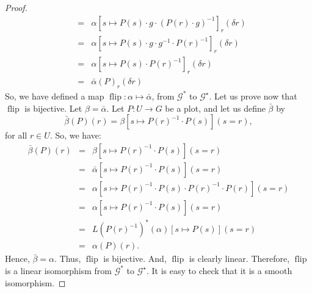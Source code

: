 \documentclass[10pt,reqno,twoside]{amsart}
\newcommand{\cG}{\mathcal{G}}
\DeclareMathOperator{\flip}{flip}
\renewcommand{\L}{L}
\theoremstyle{plain}
\theoremstyle{definition}
\begin{document}
\begin{proof}
\begin{eqnarray*}
      & = & \alpha\left[s \mapsto P (s) \cdot g \cdot (P (r) \cdot g)^{-1}\right]_r(\delta r) \\
      & = & \alpha\left[s \mapsto P (s) \cdot g \cdot g^{-1} \cdot P (r)^{-1}\right]_r(\delta r) \\
      & = & \alpha\left[s \mapsto P (s) \cdot P (r)^{-1}\right]_r(\delta r) \\
      & = & \bar{\alpha}(P)_r(\delta r)
    \end{eqnarray*}
    So,
    we have defined a map $\flip : \alpha \mapsto \bar \alpha$,
    from $\cG^*$ to $\cG^\star$.
    Let us prove now that $\flip$ is bijective.
    Let $\beta = \bar \alpha$.
    Let $P : U \to G$ be a plot,
    and let us define $\bar \beta$ by
    $$\bar \beta(P)(r) = \beta [s \mapsto P (r)^{-1} \cdot P (s)](s=r),
      $$
    for all $r \in U$.
    So,
    we have:
    \begin{eqnarray*}
      \bar\beta(P)(r)
      & = & \beta \left[s \mapsto P (r)^{-1} \cdot P (s)\right](s=r) \\
      & = & \bar \alpha \left[s \mapsto P (r)^{-1} \cdot P (s)\right](s=r) \\
      & = & \alpha \left[s \mapsto P (r)^{-1} \cdot P (s) \cdot P (r)^{-1} \cdot P (r) \right](s=r) \\
      & = & \alpha \left[s \mapsto P (r)^{-1} \cdot P (s) \right](s=r) \\
      & = & \L(P (r)^{-1})^*(\alpha) \left[s \mapsto P (s) \right](s=r) \\
      & = & \alpha(P)(r).
    \end{eqnarray*}
    Hence,
    $\bar \beta = \alpha$.
    Thus,
    $\flip$ is bijective.
    And,
    $\flip$ is clearly linear.
    Therefore,
    $\flip$ is a linear isomorphism from $\cG^*$ to $\cG^\star$.
    It is easy to check that it is a smooth isomorphism.
    

\end{proof}
\end{document}
